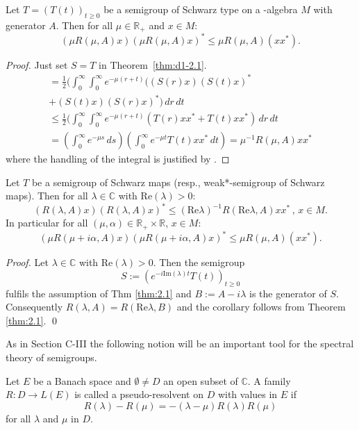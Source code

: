 \begin{corollary}\label{cor:d1-2.2}
Let $ T = (T(t))_{t\geq0} $ be a semigroup of Schwarz type on a \CA-algebra $ M $ with generator $ A $.
Then for all $ \mu \in \mathbb{R}_{+} $ and $ x \in M $:
\[
(\mu R(\mu,A)x)(\mu R(\mu,A)x)^{*} \leq \mu R(\mu,A)(xx^{*}).
\]
\end{corollary}
%
\begin{proof}
Just set $ S = T $ in Theorem~\ref{thm:d1-2.1}.
\begin{multline*}
= \frac{1}{2}(\int_{0}^\infty \int_{0}^\infty e^{-\mu(r+t)} ((S(r)x)(S(t)x)^{*} \\
+ (S(t)x)(S(r)x)^{*}) \, dr \, dt \\
\leq \frac{1}{2}(\int_{0}^\infty \int_{0}^\infty e^{-\mu(r+t)} (T(r)xx^{*} + T(t)xx^{*}) \, dr \, dt \\
= (\int_{0}^\infty e^{-\mu s} \, ds)(\int_{0}^\infty e^{-\mu t}T(t)xx^{*} \, dt) = \mu^{-1}R(\mu,A)xx^{*}
\end{multline*}
where the handling of the integral is justified by \cite[§8, n° 4, Proposition 9]{bourbaki:1955}.
\end{proof}


\begin{corollary}\label{cor:d1-2.3}
Let $ T $ be a semigroup of Schwarz maps (resp., weak*-semigroup of Schwarz maps).
Then for all $ \lambda \in \mathbb{C} $ with $ \text{Re}(\lambda) > 0 $:
\[
(R(\lambda,A)x)(R(\lambda,A)x)^{*} \leq (\text{Re}\lambda)^{-1} R(\text{Re}\lambda,A)xx^{*} \, , \, x \in M .
\]
In particular for all $ (\mu,\alpha) \in \mathbb{R}_{+} \times \mathbb{R} $, $ x \in M $:
\[
(\mu R(\mu+i\alpha,A)x)(\mu R(\mu+i\alpha,A)x)^{*} \leq \mu R(\mu,A)(xx^{*}).
\]
\end{corollary}

\begin{proof}
Let $ \lambda \in \mathbb{C} $ with $ \text{Re}(\lambda) > 0 $.
Then the semigroup
\[
S := (e^{-i\text{Im}(\lambda)t}T(t))_{t\geq0}
\]
fulfils the assumption of Thm \ref{thm:2.1} and $ B := A - i\lambda $ is the generator of $ S $.
Consequently $ R(\lambda,A) = R(\text{Re}\lambda,B) $ and the corollary follows from Theorem \ref{thm:2.1}.
\qed
\end{proof}

As in Section C-III the following notion will be an important tool for the spectral theory of semigroups.

\begin{definition}\label{def:d1-2.3}
Let $ E $ be a Banach space and $ \emptyset \neq D $ an open subset of $ \mathbb{C} $.
A family $ R: D \to L(E) $ is called a pseudo-resolvent on $ D $ with values in $ E $ if
\[
R(\lambda) - R(\mu) = -(\lambda - \mu)R(\lambda)R(\mu)
\]
for all $ \lambda $ and $ \mu $ in $ D $.
\end{definition}

